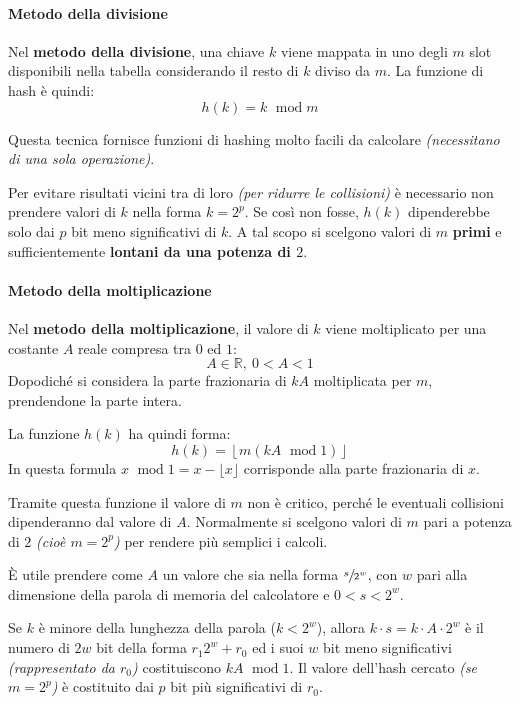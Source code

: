 \documentclass[italian, 10pt]{article}
\DeclareMathOperator{\modop}{\ mod}
\begin{document}
\paragraph{Metodo della divisione}

Nel \textbf{metodo della divisione}, una chiave \(k\) viene mappata in uno degli \(m\) slot disponibili nella tabella considerando il resto di \(k\) diviso da \(m\).
La funzione di hash è quindi:
\[ h(k) = k \modop m \]

\bigskip
Questa tecnica fornisce funzioni di hashing molto facili da calcolare \textit{(necessitano di una sola operazione)}.

Per evitare risultati vicini tra di loro \textit{(per ridurre le collisioni)} è necessario non prendere valori di \(k\) nella forma \(k = 2^p\).
Se così non fosse, \(h(k)\) dipenderebbe solo dai \(p\) bit meno significativi di \(k\).
A tal scopo si scelgono valori di \(m\) \textbf{primi} e sufficientemente \textbf{lontani da una potenza di \(2\)}.

\paragraph{Metodo della moltiplicazione}

Nel \textbf{metodo della moltiplicazione}, il valore di \(k\) viene moltiplicato per una costante \(A\) reale compresa tra \(0\) ed \(1\):
\[ A \in \mathbb{R},\ 0 < A < 1 \]
Dopodiché si considera la parte frazionaria di \(kA\) moltiplicata per \(m\), prendendone la parte intera.

La funzione \(h(k)\) ha quindi forma:
\[h(k) = \left\lfloor m (kA \modop 1) \right\rfloor \]
In questa formula \(x \modop 1 = x - \lfloor x \rfloor\) corrisponde alla parte frazionaria di \(x\).

Tramite questa funzione il valore di \(m\) non è critico, perché le eventuali collisioni dipenderanno dal valore di \(A\).
Normalmente si scelgono valori di \(m\) pari a potenza di \(2\) \textit{(cioè \(m = 2^p\))} per rendere più semplici i calcoli.

\bigskip
È utile prendere come \(A\) un valore che sia nella forma \(\sfrac{s}{2^w}\), con \(w\) pari alla dimensione della parola di memoria del calcolatore e \(0 < s < 2^w\).

Se \(k\) è minore della lunghezza della parola (\(k < 2^w\)), allora \(k \cdot s = k \cdot A \cdot 2^w\) è il numero di \(2w\) bit della forma \(r_1 2^w + r_0\) ed i suoi \(w\) bit meno significativi \textit{(rappresentato da \(r_0\))} costituiscono \(kA \modop 1\).
Il valore dell'hash cercato \textit{(se \(m = 2^p\))} è costituito dai \(p\) bit più significativi di \(r_0\).
\end{document}
